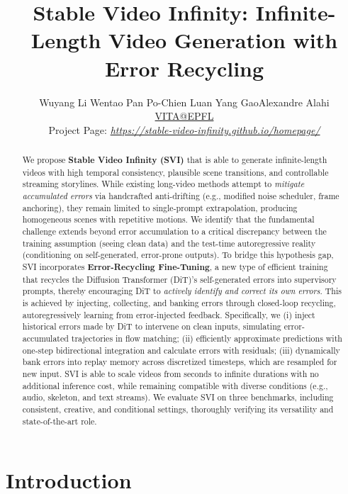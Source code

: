 \documentclass{article} %
\title{Stable Video Infinity: Infinite-Length Video Generation with Error Recycling}
\author{
\begin{minipage}[t]{\textwidth}
\centering\hspace*{-2em}
Wuyang Li \quad Wentao Pan \quad Po-Chien Luan \quad Yang Gao\quad Alexandre Alahi \\[0.1cm]
\centering\hspace*{-4em}
 \href{https://www.epfl.ch/labs/vita/}{VITA@EPFL} \\
\centering\hspace*{-6em}
Project Page: \href{https://stable-video-infinity.github.io/homepage/}{\emph{https://stable-video-infinity.github.io/homepage/}}
\end{minipage}
}
\begin{document}
\newcommand{\blackcircled}[1]{%
\tikz[baseline=(char.base)]{
\node[shape=circle, fill=black, text=white, inner sep=0.8pt, minimum size=0.5em] (char) {\small #1};
}
}

\maketitle

\begin{abstract}
We propose \textbf{Stable Video Infinity (SVI)} that is able to generate infinite-length videos with high temporal consistency, plausible scene transitions, and controllable streaming storylines. While existing long-video methods attempt to \emph{mitigate accumulated errors} via handcrafted anti-drifting (e.g., modified noise scheduler, frame anchoring), they remain limited to single-prompt extrapolation, producing homogeneous scenes with repetitive motions. We identify that the fundamental challenge extends beyond error accumulation to a critical discrepancy between the training assumption (seeing clean data) and the test-time autoregressive reality (conditioning on self-generated, error-prone outputs). To bridge this hypothesis gap, SVI incorporates \textbf{Error-Recycling Fine-Tuning}, a new type of efficient training that recycles the Diffusion Transformer (DiT)’s self-generated errors into supervisory prompts, thereby encouraging DiT to \emph{actively identify and correct its own errors}. This is achieved by injecting, collecting, and banking errors through closed-loop recycling, autoregressively learning from error-injected feedback. Specifically, we (i) inject historical errors made by DiT to intervene on clean inputs, simulating error-accumulated trajectories in flow matching; (ii) efficiently approximate predictions with one-step bidirectional integration and calculate errors with residuals; (iii) dynamically bank errors into replay memory across discretized timesteps, which are resampled for new input. SVI is able to scale videos from seconds to infinite durations with no additional inference cost, while remaining compatible with diverse conditions (e.g., audio, skeleton, and text streams). We evaluate SVI on three benchmarks, including consistent, creative, and conditional settings, thoroughly verifying its versatility and state-of-the-art role. 

\end{abstract}
\section{Introduction}
\end{document}
